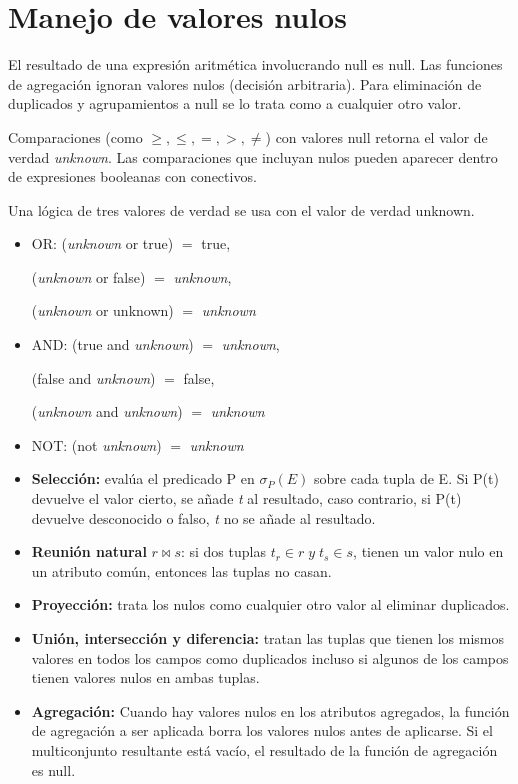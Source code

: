 \documentclass[12pt,a4paper]{report}
\newcounter{neq}
\begin{document}
	\section{Manejo de valores nulos}
		\par El resultado de una expresión aritmética involucrando null es null. Las funciones de agregación ignoran valores nulos (decisión arbitraria). Para eliminación de duplicados y agrupamientos a null se lo trata como a cualquier otro valor.
		\par Comparaciones (como $\geq, \leq , =, >, \neq$) con valores null retorna el valor de verdad \textit{unknown}. Las comparaciones que incluyan nulos pueden aparecer dentro de expresiones booleanas con conectivos.
		\vspace{5mm}
		\par Una lógica de tres valores de verdad se usa con el valor de verdad unknown.
		\begin{itemize}
			\item OR: (\textit{unknown} or true) $=$ true,
			\par (\textit{unknown} or false) $=$ \textit{unknown},
			\par (\textit{unknown} or unknown) $=$ \textit{unknown}
			\item AND: (true and \textit{unknown}) $=$ \textit{unknown}, 
			\par (false and \textit{unknown}) $=$ false, 
			\par (\textit{unknown} and \textit{unknown}) $=$ \textit{unknown}
			\item NOT: (not \textit{unknown}) $=$ \textit{unknown}
		\end{itemize}

		\begin{itemize}
			\item \textbf{Selección:} evalúa el predicado P en $\sigma_{P}(E)$ sobre cada tupla de E. Si P(t) devuelve el valor cierto, se añade \textit{t} al resultado, caso contrario, si P(t) devuelve desconocido o falso, \textit{t} no se añade al resultado.
			\item \textbf{Reunión natural} $r \bowtie s$: si dos tuplas $t_{r} \in r \; y \; t_{s} \in s$, tienen un valor nulo en un atributo común, entonces las tuplas no casan.
			\item \textbf{Proyección:} trata los nulos como cualquier otro valor al eliminar duplicados.
			\item \textbf{Unión, intersección y diferencia:} tratan las tuplas que tienen los mismos valores en todos los campos como duplicados incluso si algunos de los campos tienen valores nulos en ambas tuplas.
			\item \textbf{Agregación:} Cuando hay valores nulos en los atributos agregados, la función de agregación a ser aplicada borra los valores nulos antes de aplicarse. Si el multiconjunto resultante está vacío, el resultado de la función de agregación es null.
		\end{itemize}
\end{document}
